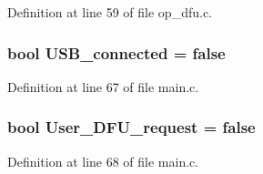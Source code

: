 \-Definition at line 59 of file op\-\_\-dfu.\-c.

\hypertarget{group___flying_f3_b_l_ga4e4577933ec2d1b36fd2a19510090d43}{
\subsubsection[{\-U\-S\-B\-\_\-connected}]{\setlength{\rightskip}{0pt plus 5cm}bool {\bf \-U\-S\-B\-\_\-connected} = false}}\label{group___flying_f3_b_l_ga4e4577933ec2d1b36fd2a19510090d43}


\-Definition at line 67 of file main.\-c.

\hypertarget{group___flying_f3_b_l_ga4df4c80fe3df830049b9543a72b125a5}{
\subsubsection[{\-User\-\_\-\-D\-F\-U\-\_\-request}]{\setlength{\rightskip}{0pt plus 5cm}bool {\bf \-User\-\_\-\-D\-F\-U\-\_\-request} = false}}\label{group___flying_f3_b_l_ga4df4c80fe3df830049b9543a72b125a5}


\-Definition at line 68 of file main.\-c.

